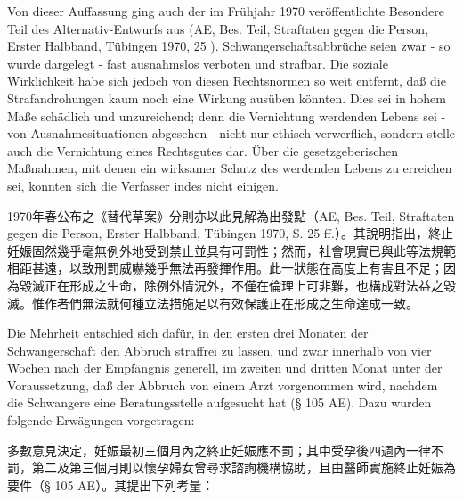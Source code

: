 \documentclass[12pt]{article}
\begin{document}
\syncleft
\begin{sourcepara}
Von dieser Auffassung ging auch der im Frühjahr 1970 veröffentlichte Besondere Teil des Alternativ-Entwurfs aus (AE, Bes. Teil, Straftaten gegen die Person, Erster Halbband, Tübingen 1970, \abbrS{} 25 \abbrFF{}). Schwangerschaftsabbrüche seien zwar - so wurde dargelegt - fast ausnahmslos verboten und strafbar. Die soziale Wirklichkeit habe sich jedoch von diesen Rechtsnormen so weit entfernt, daß die Strafandrohungen kaum noch eine Wirkung ausüben könnten. Dies sei in hohem Maße schädlich und unzureichend; denn die Vernichtung werdenden Lebens sei - von Ausnahmesituationen abgesehen - nicht nur ethisch verwerflich, sondern stelle auch die Vernichtung eines Rechtsgutes dar. Über die gesetzgeberischen Maßnahmen, mit denen ein wirksamer Schutz des werdenden Lebens zu erreichen sei, konnten sich die Verfasser indes nicht einigen.
\end{sourcepara}
\begin{transpara}
1970年春公布之《替代草案》分則亦以此見解為出發點（AE, Bes. Teil, Straftaten gegen die Person, Erster Halbband, Tübingen 1970, S. 25 ff.）。其說明指出，終止妊娠固然幾乎毫無例外地受到禁止並具有可罰性；然而，社會現實已與此等法規範相距甚遠，以致刑罰威嚇幾乎無法再發揮作用。此一狀態在高度上有害且不足；因為毀滅正在形成之生命，除例外情況外，不僅在倫理上可非難，也構成對法益之毀滅。惟作者們無法就何種立法措施足以有效保護正在形成之生命達成一致。
\end{transpara}

\syncleft
\begin{sourcepara}
Die Mehrheit entschied sich dafür, in den ersten drei Monaten der Schwangerschaft den Abbruch straffrei zu lassen, und zwar innerhalb von vier Wochen nach der Empfängnis generell, im zweiten und dritten Monat unter der Voraussetzung, daß der Abbruch von einem Arzt vorgenommen wird, nachdem die Schwangere eine Beratungsstelle aufgesucht hat (§ 105 AE). Dazu wurden folgende Erwägungen vorgetragen:
\end{sourcepara}
\begin{transpara}
多數意見決定，妊娠最初三個月內之終止妊娠應不罰；其中受孕後四週內一律不罰，第二及第三個月則以懷孕婦女曾尋求諮詢機構協助，且由醫師實施終止妊娠為要件（§ 105 AE）。其提出下列考量：
\end{transpara}
\end{document}
